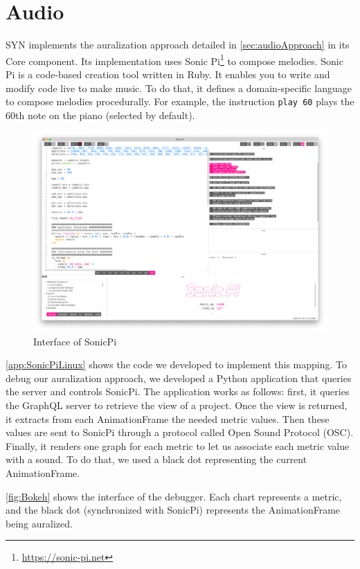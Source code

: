 \section{Audio}
SYN implements the auralization approach detailed in \autoref{sec:audioApproach} in its Core component. 
Its implementation uses Sonic Pi\footnote{\url{https://sonic-pi.net}} to compose melodies. Sonic Pi is a code-based creation tool written in Ruby. It enables you to write and modify code live to make music. To do that, it defines a domain-specific language to compose melodies procedurally. For example, the instruction \texttt{play 60} plays the 60th note on the piano (selected by default). 

\begin{figure}
    \center
    \includegraphics[width=\textwidth]{SonicPi.png}
    \caption{Interface of SonicPi}
    \label{fig:sonicpi}
\end{figure}

\autoref{app:SonicPiLinux} shows the code we developed to implement this mapping. To debug our auralization approach, we developed a Python application that queries the server and controls SonicPi. The application works as follows: first, it queries the GraphQL server to retrieve the view of a project. Once the view is returned, it extracts from each AnimationFrame the needed metric values. Then these values are sent to SonicPi through a protocol called Open Sound Protocol (OSC). Finally, it renders one graph for each metric to let us associate each metric value with a sound. To do that, we used a black dot representing the current AnimationFrame. 

\autoref{fig:Bokeh} shows the interface of the debugger. Each chart represents a metric, and the black dot (synchronized with SonicPi) represents the AnimationFrame being auralized. 


